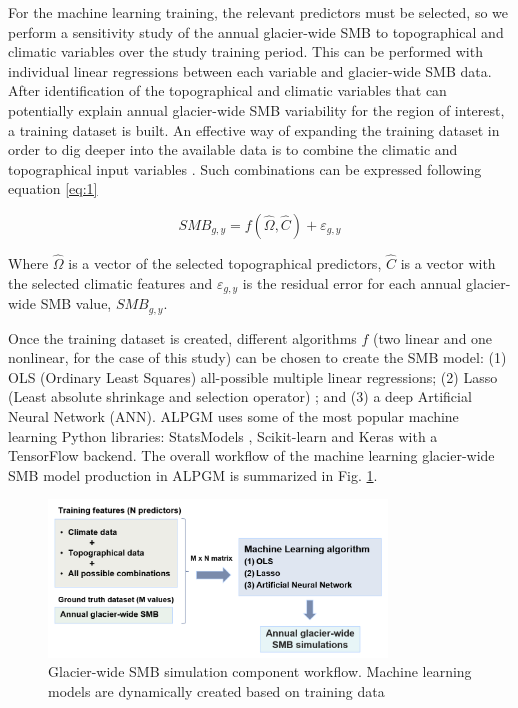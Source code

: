 For the machine learning training, the relevant predictors must be selected, so we perform a sensitivity study of the annual glacier-wide SMB to topographical and climatic variables over the study training period. This can be performed with individual linear regressions between each variable and glacier-wide SMB data. After identification of the topographical and climatic variables that can potentially explain annual glacier-wide SMB variability for the region of interest, a training dataset is built. An effective way of expanding the training dataset in order to dig deeper into the available data is to combine the climatic and topographical input variables \citep{weisberg_applied_2014}. Such combinations can be expressed following equation \ref{eq:1}

\begin{equation} \label{eq:1}
SMB_{g, y}=f(\hat{\Omega}, \hat{C})+\varepsilon_{g, y}
\end{equation}

Where $\hat{\Omega}$ is a vector of the selected topographical predictors, $\hat{C}$ is a vector with the selected climatic features and $\varepsilon_{g, y}$ is the residual error for each annual glacier-wide SMB value, $SMB_{g, y}$.

Once the training dataset is created, different algorithms $f$ (two linear and one nonlinear, for the case of this study) can be chosen to create the SMB model: (1) OLS (Ordinary Least Squares) all-possible multiple linear regressions; (2) Lasso (Least absolute shrinkage and selection operator) \citep{tibshirani_regression_1996}; and (3) a deep Artificial Neural Network (ANN). ALPGM uses some of the most popular machine learning Python libraries: StatsModels \citep{seabold_statsmodels:_2010}, Scikit-learn \citep{pedregosa_scikit-learn:_2012} and Keras \citep{chollet_keras_2015} with a TensorFlow backend. The overall workflow of the machine learning glacier-wide SMB model production in ALPGM is summarized in Fig. \ref{methods:fig2}.  

\begin{figure}[t]
\centering
\includegraphics[width=9cm]{Figures/methods/Figure_2.png}
\caption{Glacier-wide SMB simulation component workflow. Machine learning models are dynamically created based on training data}
\label{methods:fig2}
\end{figure}

